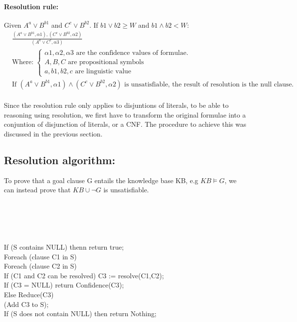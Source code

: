 \documentclass[part1.tex]{subfiles}
\begin{document}
\paragraph{Resolution rule:} Given \(A^a \vee B^{b1}\) and \(C^c \vee B^{b2}\). If \(b1 \vee b2 
\ge W\) and \(b1 \wedge b2 < W\):
\begin{align*}
	&\frac{(A^a \vee B^{b1}, {\alpha 1}), (C^c \vee B^{b2}, {\alpha 2})} {(A^a \vee C^c, {\alpha 3})}\\
	&\text{Where: }
	\begin{cases}
	\alpha 1, \alpha 2, \alpha 3 \text{ are the confidence
        values of formulae.}\\
	A, B, C \text{ are propositional symbols}\\
	a, b1, b2, c \text{ are linguistic value}
	\end{cases}
	\\
	&\text{If } (A^a \vee B^{b1}, {\alpha 1}) \wedge (C^c \vee B^{b2}, {\alpha 2}) \text{ is 
	unsatisfiable, the result of resolution is the null clause.} 
\end{align*}
\paragraph{} Since the resolution rule only applies to
disjuntions of literals, to be able to reasoning using
resolution, we first have to transform the original formulae into
a conjuntion of disjunction of literals, or a CNF.  The procedure
to achieve this was discussed in the previous section.\\

\subsection{Resolution algorithm:} 
 To prove that a goal clause G entails the knowledge base KB, e.g \(KB \models G\), we can instead prove
that \(KB \cup \neg G\) is unsatisfiable.\\\\
\\
\\\\
\\
\indent If (S contains NULL) thenn return true;\\
\indent Foreach (clause C1 in S)\\
\indent \indent Foreach (clause C2 in S)\\
\indent \indent \indent If (C1 and C2 can be resolved) C3 := resolve(C1,C2);\\
\indent \indent \indent If (C3 = NULL) return Confidence(C3);\\
\indent \indent \indent Else Reduce(C3)\\
\indent \indent \indent \indent (Add C3 to S);\\
\indent If (S does not contain NULL) then return Nothing;\\
\end{document}
